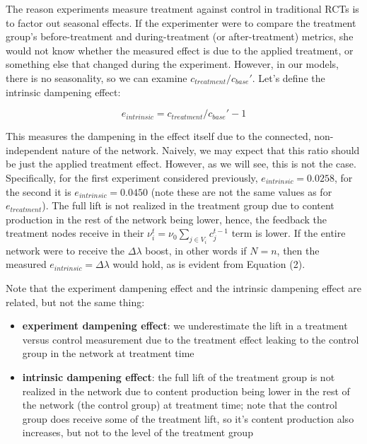 \documentclass[final,5p,times,twocolumn,authoryear]{elsarticle}
\begin{document}
The reason experiments measure treatment against control in traditional RCTs is to factor out seasonal effects. If the experimenter were to compare the treatment group's before-treatment and during-treatment (or after-treatment) metrics, she would not know whether the measured effect is due to the applied treatment, or something else that changed during the experiment. However, in our models, there is no seasonality, so we can examine $c_{treatment}/c_{base}\prime$. Let's define the intrinsic dampening effect:

\begin{equation}
e_{intrinsic} = c_{treatment} / c_{base}\prime - 1
\end{equation}

This measures the dampening in the effect itself due to the connected, non-independent nature of the network. Naively, we may expect that this ratio should be just the applied treatment effect. However, as we will see, this is not the case. Specifically, for the first experiment considered previously, $e_{intrinsic} = 0.0258$, for the second it is $e_{intrinsic} = 0.0450$ (note these are not the same values as for $e_{treatment}$). The full lift is not realized in the treatment group due to content production in the rest of the network being lower, hence, the feedback the treatment nodes receive in their $\nu_i^t = \nu_0 \sum_{j \in V_i}{c_j^{t-1}}$ term is lower. If the entire network were to receive the $\Delta \lambda$ boost, in other words if $N=n$, then the measured $e_{intrinsic} = \Delta \lambda$ would hold, as is evident from Equation (2).

Note that the experiment dampening effect and the intrinsic dampening effect are related, but not the same thing:

\begin{itemize}
\setlength\itemsep{0em}
    \item \textbf{experiment dampening effect}: we underestimate the lift in a treatment versus control measurement due to the treatment effect leaking to the control group in the network at treatment time
    \item \textbf{intrinsic dampening effect}: the full lift of the treatment group is not realized in the network due to content production being lower in the rest of the network (the control group) at treatment time; note that the control group does receive some of the treatment lift, so it's content production also increases, but not to the level of the treatment group
\end{itemize}
\end{document}

